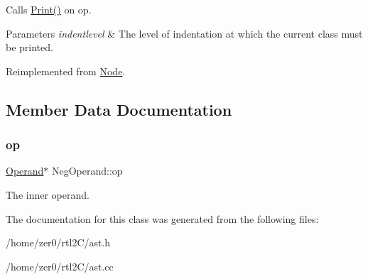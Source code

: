 Calls \hyperlink{class_node_a9ef727fd72d1a37792b3db60a8a479dd}{Print()} on op. 
\begin{DoxyParams}{Parameters}
{\em indentlevel} & The level of indentation at which the current class must be printed. \\
\hline
\end{DoxyParams}


Reimplemented from \hyperlink{class_node_a3e67ec8d22182b721717af14fe0c3000}{Node}.



\subsection{Member Data Documentation}
\mbox{\label{class_neg_operand_aaf0c1ec10d1b71df28784c897d1a2239}} 
\subsubsection{\texorpdfstring{op}{op}}
{\footnotesize\ttfamily \hyperlink{class_operand}{Operand}$\ast$ Neg\+Operand\+::op\hspace{0.3cm}{\ttfamily [protected]}}

The inner operand. 

The documentation for this class was generated from the following files\+:\begin{DoxyCompactItemize}
\item 
/home/zer0/rtl2\+C/ast.\+h\item 
/home/zer0/rtl2\+C/ast.\+cc\end{DoxyCompactItemize}

